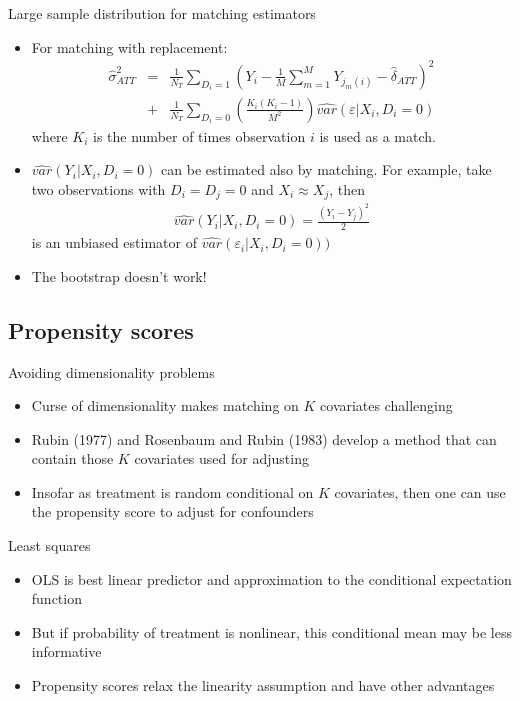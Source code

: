 \documentclass{beamer}
\begin{document}
\begin{frame}{Large sample distribution for matching estimators}
	
	\begin{itemize}
	\item For matching with replacement:
		\begin{eqnarray*}
		\widehat{\sigma}^2_{ATT} &=& \frac{1}{N_T} \sum_{D_i=1} \left( Y_i - \frac{1}{M} \sum_{m=1}^M Y_{j_m(i)} - \widehat{\delta}_{ATT} \right)^2 \\
		&+& \frac{1}{N_T} \sum_{D_i=0} \left( \frac{K_i(K_i-1)}{M^2} \right) \widehat{var}(\varepsilon | X_i,D_i=0)
		\end{eqnarray*}where $K_i$ is the number of times observation $i$ is used as a match.
	\item $\widehat{var}(Y_i | X_i,D_i=0)$ can be estimated also by matching.  For example, take two observations with $D_i=D_j=0$ and $X_i \approx X_j$, then
		\begin{eqnarray*}
		\widehat{var}(Y_i | X_i,D_i=0) = \frac{(Y_i-Y_j)^2}{2}
		\end{eqnarray*}is an unbiased estimator of $\widehat{var}(\varepsilon_i | X_i,D_i=0))$
	\item The bootstrap doesn't work!
	\end{itemize}
\end{frame}
	

		  
\subsection{Propensity scores}

\begin{frame}{Avoiding dimensionality problems}
	
	\begin{itemize}
	\item Curse of dimensionality makes matching on $K$ covariates challenging
	\item Rubin (1977) and Rosenbaum and Rubin (1983) develop a method that can contain those $K$ covariates used for adjusting
	\item Insofar as treatment is random conditional on $K$ covariates, then one can use the propensity score to adjust for confounders 
	\end{itemize}
	
\end{frame}



\begin{frame}{Least squares}
	
	\begin{itemize}
	\item OLS is best linear predictor and approximation to the conditional expectation function 
	\item But if probability of treatment is nonlinear, this conditional mean may be less informative
	\item Propensity scores relax the linearity assumption and have other advantages
	\end{itemize}
\end{frame}
\end{document}
